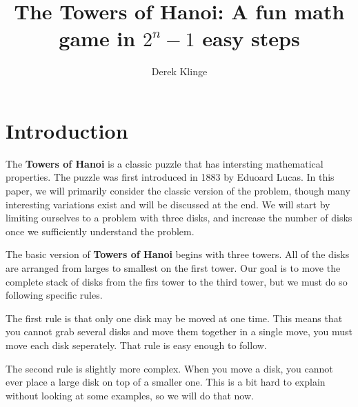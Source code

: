 \documentclass[12pt]{article}
\title{The Towers of Hanoi: A fun math game in $2^n-1$ easy steps}
\author{Derek Klinge}
\date{}
\newcommand{\ToH}{\textbf{Towers of Hanoi}}
\begin{document}
\maketitle

\section{Introduction}

The {\ToH} is a classic puzzle that has intersting mathematical properties. The
puzzle was first introduced in 1883 by Eduoard Lucas\cite{palmer1996exploring}.
In this paper, we will primarily consider the classic version of the problem, though many
interesting variations exist and will be discussed at the end. We will start by
limiting ourselves to a problem with three disks, and increase the number of
disks once we sufficiently understand the problem.

The basic version of {\ToH} begins with three towers. All of the disks are
arranged from larges to smallest on the first tower. Our goal is to move the
complete stack of disks from the firs tower to the third tower, but we must do
so following specific rules. 

The first rule is that only one disk may be moved
at one time. This means that you cannot grab several disks and move them
together in a single move, you must move each disk seperately. That rule is easy
enough to follow.

The second rule is slightly more complex. When you move a disk, you cannot ever
place a large disk on top of a smaller one. This is a bit hard to explain
without looking at some examples, so we will do that now.



  
\end{document}
